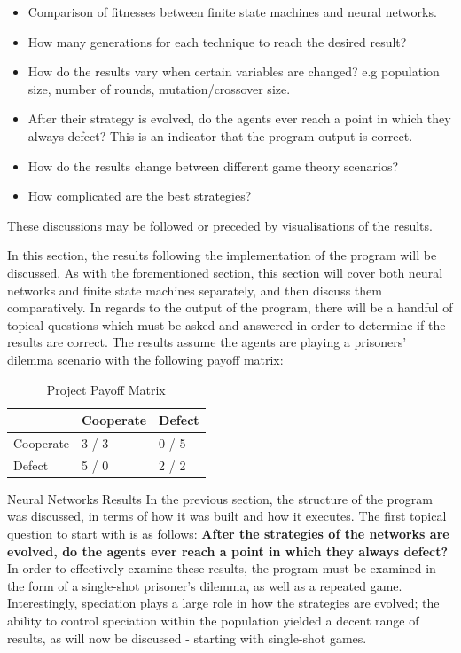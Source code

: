 \documentclass[12pt,a4paper]{article}
\makeatletter
\renewcommand\subsection{\@startsection {subsection}{1}{2mm}
                               {3pt plus 2pt minus 1pt}
                               {3pt plus 0pt}
                               {\normalfont\bfseries}}
\makeatother
\begin{document}
\begin{itemize}
  \item Comparison of fitnesses between finite state machines and neural networks.
  \item How many generations for each technique to reach the desired result?
  \item How do the results vary when certain variables are changed? e.g population size, number of rounds, mutation/crossover size.
  \item After their strategy is evolved, do the agents ever reach a point in which they always defect? This is an indicator that the program output is correct.
  \item How do the results change between different game theory scenarios?
  \item How complicated are the best strategies?
\end{itemize}

These discussions may be followed or preceded by visualisations of the results.
\fi

In this section, the results following the implementation of the program will be discussed. As with the forementioned section, this section will cover both neural networks and finite state machines separately, and then discuss them comparatively. In regards to the output of the program, there will be a handful of topical questions which must be asked and answered in order to determine if the results are correct. The results assume the agents are playing a prisoners' dilemma scenario with the following payoff matrix: \\

\begin{table}[H]
    \centering
    \begin{tabular}{| l | l | l |}
    \hline
     & Cooperate & Defect  \\ \hline
    Cooperate & 3 / 3 & 0 / 5 \\ \hline
    Defect & 5 / 0 & 2 / 2 \\ \hline
    \end{tabular}
    \caption{Project Payoff Matrix}
\end{table}

\subsection{Neural Networks Results}
In the previous section, the structure of the program was discussed, in terms of how it was built and how it executes. The first topical question to start with is as follows: \textbf{After the strategies of the networks are evolved, do the agents ever reach a point in which they always defect?} In order to effectively examine these results, the program must be examined in the form of a single-shot prisoner's dilemma, as well as a repeated game. Interestingly, speciation plays a large role in how the strategies are evolved; the ability to control speciation within the population yielded a decent range of results, as will now be discussed - starting with single-shot games.
\end{document}
